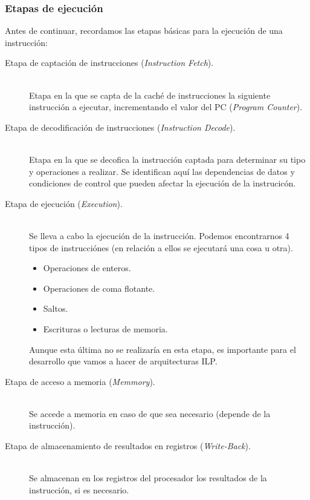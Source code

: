 \subsubsection{Etapas de ejecución}
Antes de continuar, recordamos las etapas básicas para la ejecución de una instrucción:
\begin{description}
    \item [Etapa de captación de instrucciones (\emph{Instruction Fetch}).]~\\
        Etapa en la que se capta de la caché de instrucciones la siguiente instrucción a ejecutar, incrementando el valor del PC (\emph{Program Counter}).
    \item [Etapa de decodificación de instrucciones (\emph{Instruction Decode}).]~\\
        Etapa en la que se decofica la instrucción captada para determinar su tipo y operaciones a realizar. Se identifican aquí las dependencias de datos y condiciones de control que pueden afectar la ejecución de la instrucicón.
    \item [Etapa de ejecución (\emph{Execution}).]~\\
        Se lleva a cabo la ejecución de la instrucción. Podemos encontrarnos 4 tipos de instrucciónes (en relación a ellos se ejecutará una cosa u otra).
        \begin{itemize}
            \item Operaciones de enteros.
            \item Operaciones de coma flotante.
            \item Saltos.
            \item Escrituras o lecturas de memoria.
        \end{itemize}
        Aunque esta última no se realizaría en esta etapa, es importante para el desarrollo que vamos a hacer de arquitecturas ILP\@.
    \item [Etapa de acceso a memoria (\emph{Memmory}).]~\\
        Se accede a memoria en caso de que sea necesario (depende de la instrucción).
    \item [Etapa de almacenamiento de resultados en registros (\emph{Write-Back}).]~\\
        Se almacenan en los registros del procesador los resultados de la instrucción, si es necesario.
\end{description}

